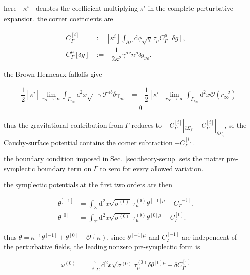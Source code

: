 here $\displaystyle{[\kappa ^{i}]}$ denotes the coefficient multiplying $\displaystyle{\kappa ^{i}}$ in the complete perturbative expansion. the corner coefficients are

\[\begin{aligned}
C_{\Gamma}^{[i]} &:=[\kappa ^{i}]\int _{\partial\Sigma}\mathrm{d}\phi\sqrt{q}\,\tau _{\mu}C_{\Gamma}^{\mu}[\delta g], \\
C_{\Gamma}^{\mu}[\delta g] &:=-\dfrac{1}{2\kappa ^{2}}\gamma ^{\mu\nu}n^{\rho}\delta g_{\nu\rho}.
\end{aligned}\]

the Brown-Henneaux falloffs give

\begin{align}
-\dfrac{1}{2}[\kappa ^{i}]\lim_{ r_{\infty} \to \infty } \int _{\Gamma _{r_{\infty}}}\mathrm{d}^{2}x\sqrt{ -\gamma }\mathcal{T}^{ab}\delta \gamma _{ab} & =-\dfrac{1}{2}[\kappa ^{i}]\lim_{ r_{\infty} \to \infty } \int _{\Gamma _{r_{\infty}}}\mathrm{d}^{2}x \mathcal{O}(r_{\infty}^{-2}) \\
 & =0
\end{align}

thus the gravitational contribution from $\Gamma$ reduces to $-C_{\Gamma}^{[i]}|_{\partial\Sigma_f}+C_{\Gamma}^{[i]}|_{\partial\Sigma_i}$, so the Cauchy-surface potential contains the corner subtraction $-C_{\Gamma}^{[i]}$.

the boundary condition imposed in Sec.~\ref{sec:theory-setup} sets the matter pre-symplectic boundary term on $\displaystyle{\Gamma}$ to zero for every allowed variation.

the symplectic potentials at the first two orders are then

\[\begin{aligned}
\theta ^{[-1]} & =\int _{\Sigma}\mathrm{d}^{2}x\sqrt{\sigma ^{(0)}}\,\tau _{\mu}^{(0)}\theta ^{[-1]\mu}-C_{\Gamma}^{[-1]}, \\
\theta ^{[0]} & =\int _{\Sigma}\mathrm{d}^{2}x\sqrt{\sigma ^{(0)}}\,\tau _{\mu}^{(0)}\theta ^{[0]\mu}-C_{\Gamma}^{[0]}.
\end{aligned}\]

thus $\displaystyle{\theta=\kappa ^{-1}\theta^{[-1]}+\theta^{[0]}+\mathcal{O}(\kappa)}$. since $\displaystyle{\theta ^{[-1]\mu}}$ and $\displaystyle{C_{\Gamma}^{[-1]}}$ are independent of the perturbative fields, the leading nonzero pre-symplectic form is

\begin{align}
\omega ^{(0)} & =\int _{\Sigma}\mathrm{d}^{2}x\sqrt{ \sigma ^{(0)} }\tau _{\mu}^{(0)}\delta \theta ^{[0]\mu}-\delta C_{\Gamma}^{[0]}
\end{align}


